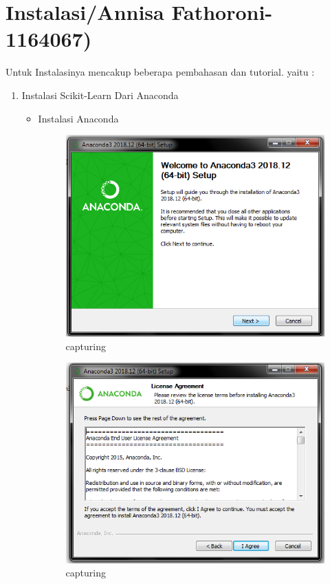 \section{Instalasi/Annisa Fathoroni-1164067)}
Untuk Instalasinya mencakup beberapa pembahasan dan tutorial. yaitu :
\begin{enumerate}
\item Instalasi Scikit-Learn Dari Anaconda 
\begin{itemize}
\item Instalasi Anaconda
\begin{enumerate}

\begin{figure}[ht]
\centering
\includegraphics[scale=0.5]{figures/1.png}
\caption{capturing}
\label{proses instalasi}
\end{figure}

\begin{figure}[ht]
\centering
\includegraphics[scale=0.5]{figures/2.png}
\caption{capturing}
\label{proses instalasi}
\end{figure}


\end{enumerate}
\end{itemize}
\end{enumerate}
